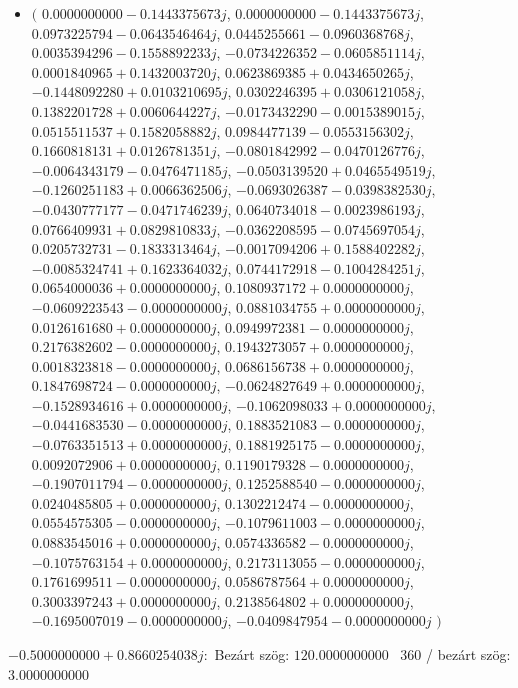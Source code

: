 \documentclass[14pt,a4paper]{article}
\begin{document}
\begin{itemize}
\item
$\big($
$0.0000000000-0.1443375673j$, $0.0000000000-0.1443375673j$, $0.0973225794-0.0643546464j$, $0.0445255661-0.0960368768j$, $0.0035394296-0.1558892233j$, $-0.0734226352-0.0605851114j$, $0.0001840965+0.1432003720j$, $0.0623869385+0.0434650265j$, $-0.1448092280+0.0103210695j$, $0.0302246395+0.0306121058j$, $0.1382201728+0.0060644227j$, $-0.0173432290-0.0015389015j$, $0.0515511537+0.1582058882j$, $0.0984477139-0.0553156302j$, $0.1660818131+0.0126781351j$, $-0.0801842992-0.0470126776j$, $-0.0064343179-0.0476471185j$, $-0.0503139520+0.0465549519j$, $-0.1260251183+0.0066362506j$, $-0.0693026387-0.0398382530j$, $-0.0430777177-0.0471746239j$, $0.0640734018-0.0023986193j$, $0.0766409931+0.0829810833j$, $-0.0362208595-0.0745697054j$, $0.0205732731-0.1833313464j$, $-0.0017094206+0.1588402282j$, $-0.0085324741+0.1623364032j$, $0.0744172918-0.1004284251j$, $0.0654000036+0.0000000000j$, $0.1080937172+0.0000000000j$, $-0.0609223543-0.0000000000j$, $0.0881034755+0.0000000000j$, $0.0126161680+0.0000000000j$, $0.0949972381-0.0000000000j$, $0.2176382602-0.0000000000j$, $0.1943273057+0.0000000000j$, $0.0018323818-0.0000000000j$, $0.0686156738+0.0000000000j$, $0.1847698724-0.0000000000j$, $-0.0624827649+0.0000000000j$, $-0.1528934616+0.0000000000j$, $-0.1062098033+0.0000000000j$, $-0.0441683530-0.0000000000j$, $0.1883521083-0.0000000000j$, $-0.0763351513+0.0000000000j$, $0.1881925175-0.0000000000j$, $0.0092072906+0.0000000000j$, $0.1190179328-0.0000000000j$, $-0.1907011794-0.0000000000j$, $0.1252588540-0.0000000000j$, $0.0240485805+0.0000000000j$, $0.1302212474-0.0000000000j$, $0.0554575305-0.0000000000j$, $-0.1079611003-0.0000000000j$, $0.0883545016+0.0000000000j$, $0.0574336582-0.0000000000j$, $-0.1075763154+0.0000000000j$, $0.2173113055-0.0000000000j$, $0.1761699511-0.0000000000j$, $0.0586787564+0.0000000000j$, $0.3003397243+0.0000000000j$, $0.2138564802+0.0000000000j$, $-0.1695007019-0.0000000000j$, $-0.0409847954-0.0000000000j$
$\big)$
\end{itemize}
$-0.5000000000+0.8660254038j$:\
Bezárt szög: $120.0000000000$ \
360 / bezárt szög: $3.0000000000$\
\end{document}
